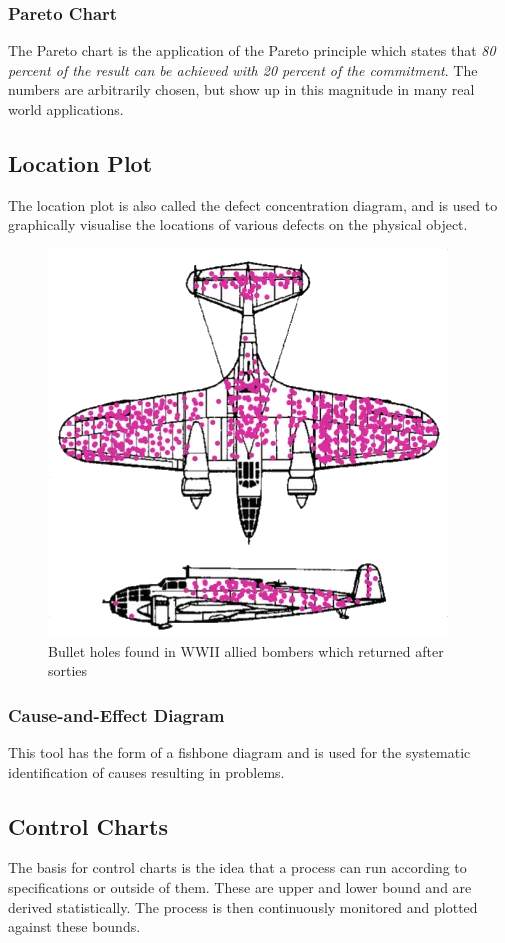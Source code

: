 \documentclass[11pt]{article}
\theoremstyle{definition}
\begin{document}
\subsubsection{Pareto Chart}
The Pareto chart is the application of the Pareto principle which states that \emph{80 percent of the result can be achieved with 20 percent of the commitment}. The numbers are arbitrarily chosen, but show up in this magnitude in many real world applications.

\subsection{Location Plot}
The location plot is also called the defect concentration diagram, and is used to graphically visualise the locations of various defects on the physical object.

\begin{figure}[H]
	\centering
	\includegraphics[width=0.5\linewidth]{img/bullet_holes_wwii}
	\caption{Bullet holes found in WWII allied bombers which returned after sorties}
	\label{fig:bulletholeswwii}
\end{figure}

\subsubsection{Cause-and-Effect Diagram}
This tool has the form of a fishbone diagram and is used for the systematic identification of causes resulting in problems.

\subsection{Control Charts}
The basis for control charts is the idea that a process can run according to specifications or outside of them. These are upper and lower bound and are derived statistically. The process is then continuously monitored and plotted against these bounds.
\end{document}
